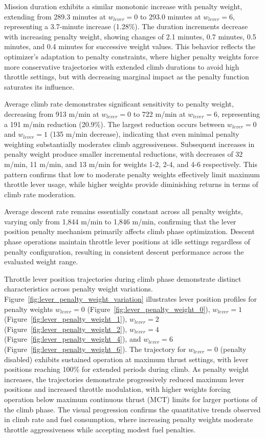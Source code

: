 Mission duration exhibits a similar monotonic increase with penalty weight, extending from 289.3 minutes at $w_{lever} = 0$ to 293.0 minutes at $w_{lever} = 6$, representing a 3.7-minute increase (1.28\%). The duration increments decrease with increasing penalty weight, showing changes of 2.1 minutes, 0.7 minutes, 0.5 minutes, and 0.4 minutes for successive weight values. This behavior reflects the optimizer's adaptation to penalty constraints, where higher penalty weights force more conservative trajectories with extended climb durations to avoid high throttle settings, but with decreasing marginal impact as the penalty function saturates its influence.

Average climb rate demonstrates significant sensitivity to penalty weight, decreasing from 913 m/min at $w_{lever} = 0$ to 722 m/min at $w_{lever} = 6$, representing a 191 m/min reduction (20.9\%). The largest reduction occurs between $w_{lever} = 0$ and $w_{lever} = 1$ (135 m/min decrease), indicating that even minimal penalty weighting substantially moderates climb aggressiveness. Subsequent increases in penalty weight produce smaller incremental reductions, with decreases of 32 m/min, 11 m/min, and 13 m/min for weights 1-2, 2-4, and 4-6 respectively. This pattern confirms that low to moderate penalty weights effectively limit maximum throttle lever usage, while higher weights provide diminishing returns in terms of climb rate moderation.


Average descent rate remains essentially constant across all penalty weights, varying only from 1,844 m/min to 1,846 m/min, confirming that the lever position penalty mechanism primarily affects climb phase optimization. Descent phase operations maintain throttle lever positions at idle settings regardless of penalty configuration, resulting in consistent descent performance across the evaluated weight range.

Throttle lever position trajectories during climb phase demonstrate distinct characteristics across penalty weight variations. Figure~\ref{fig:lever_penalty_weight_variation} illustrates lever position profiles for penalty weights $w_{lever} = 0$ (Figure~\ref{fig:lever_penalty_weight_0}), $w_{lever} = 1$ (Figure~\ref{fig:lever_penalty_weight_1}), $w_{lever} = 2$ (Figure~\ref{fig:lever_penalty_weight_2}), $w_{lever} = 4$ (Figure~\ref{fig:lever_penalty_weight_4}), and $w_{lever} = 6$ (Figure~\ref{fig:lever_penalty_weight_6}). The trajectory for $w_{lever} = 0$ (penalty disabled) exhibits sustained operation at maximum thrust settings, with lever positions reaching 100\% for extended periods during climb. As penalty weight increases, the trajectories demonstrate progressively reduced maximum lever positions and increased throttle modulation, with higher weights forcing operation below maximum continuous thrust (MCT) limits for larger portions of the climb phase. The visual progression confirms the quantitative trends observed in climb rate and fuel consumption, where increasing penalty weights moderate throttle aggressiveness while accepting modest fuel penalties.

